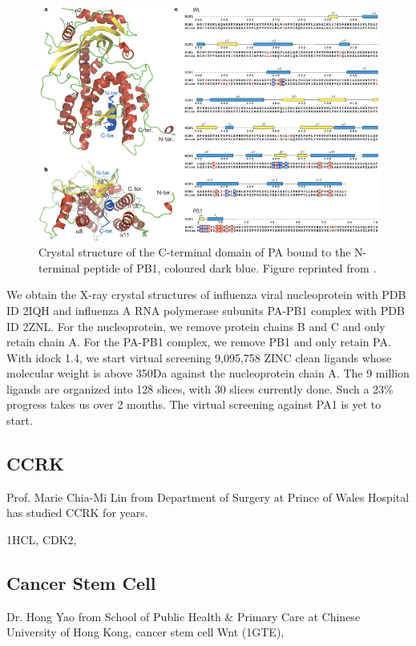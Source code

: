 \begin{figure}
\centering
\includegraphics[width=\linewidth]{Case/InfluenzaPAPB1.jpg}
\caption{Crystal structure of the C-terminal domain of PA bound to the N-terminal peptide of PB1, coloured dark blue. Figure reprinted from \citep{1141}.}
\label{Case:InfluenzaPAPB1}
\end{figure}

We obtain the X-ray crystal structures of influenza viral nucleoprotein with PDB ID 2IQH and influenza A RNA polymerase subunits PA-PB1 complex with PDB ID 2ZNL. For the nucleoprotein, we remove protein chains B and C and only retain chain A. For the PA-PB1 complex, we remove PB1 and only retain PA. With idock 1.4, we start virtual screening 9,095,758 ZINC \citep{532} clean ligands whose molecular weight is above 350Da against the nucleoprotein chain A. The 9 million ligands are organized into 128 slices, with 30 slices currently done. Such a 23\% progress takes us over 2 months. The virtual screening against PA1 is yet to start.


\subsection{CCRK}

Prof. Marie Chia-Mi Lin from Department of Surgery at Prince of Wales Hospital has studied CCRK for years.

1HCL, CDK2, \citep{1142}


\subsection{Cancer Stem Cell}

Dr. Hong Yao from School of Public Health \& Primary Care at Chinese University of Hong Kong, cancer stem cell Wnt (1GTE), 

\chapterend
